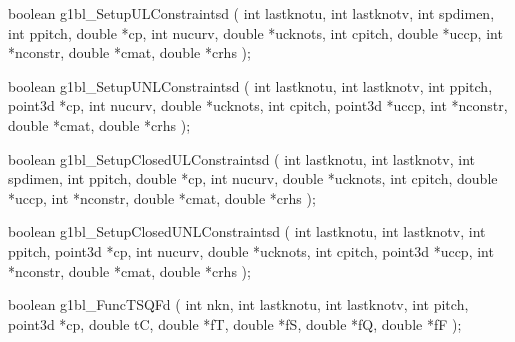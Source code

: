 \begin{listingC}
boolean g1bl_SetupULConstraintsd ( int lastknotu, int lastknotv, int spdimen,
                                   int ppitch, double *cp,
                                   int nucurv, double *ucknots,
                                   int cpitch, double *uccp,   
                                   int *nconstr, double *cmat, double *crhs );

boolean g1bl_SetupUNLConstraintsd ( int lastknotu, int lastknotv,
                                    int ppitch, point3d *cp,
                                    int nucurv, double *ucknots,
                                    int cpitch, point3d *uccp,  
                                    int *nconstr, double *cmat, double *crhs );


boolean g1bl_SetupClosedULConstraintsd ( int lastknotu, int lastknotv, int spdimen,
                                         int ppitch, double *cp,
                                         int nucurv, double *ucknots,
                                         int cpitch, double *uccp,   
                                         int *nconstr, double *cmat, double
                                         *crhs );
\end{listingC}

\begin{listingC}
boolean g1bl_SetupClosedUNLConstraintsd ( int lastknotu, int lastknotv,
                                          int ppitch, point3d *cp,
                                          int nucurv, double *ucknots,
                                          int cpitch, point3d *uccp,  
                                          int *nconstr, double *cmat, double
                                          *crhs );


boolean g1bl_FuncTSQFd ( int nkn,
                         int lastknotu, int lastknotv, int pitch, point3d *cp,
                         double tC,
                         double *fT, double *fS, double *fQ, double *fF );
\end{listingC}

